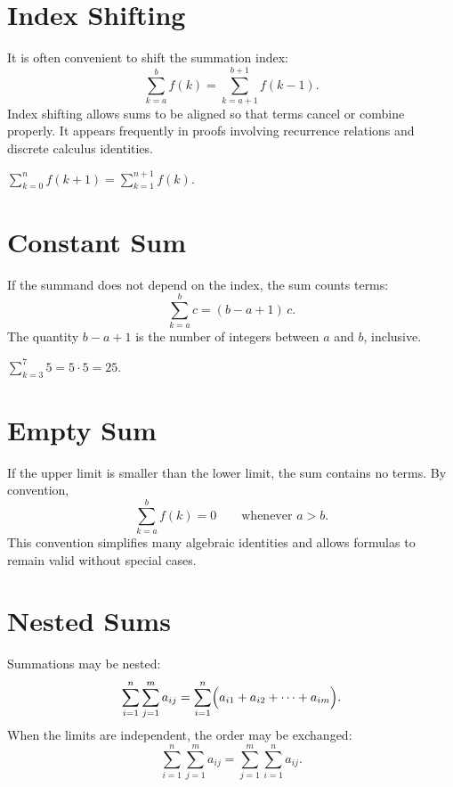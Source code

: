 \section*{Index Shifting}

\begin{remark*}
It is often convenient to shift the summation index:
\[
\sum_{k=a}^{b} f(k)
=
\sum_{k=a+1}^{b+1} f(k-1).
\]
Index shifting allows sums to be aligned so that terms cancel or
combine properly. It appears frequently in proofs involving
recurrence relations and discrete calculus identities.
\end{remark*}

\begin{example*}
\(\displaystyle\sum_{k=0}^{n} f(k+1) = \sum_{k=1}^{n+1} f(k).\)
\end{example*}

\section*{Constant Sum}

\begin{remark*}
If the summand does not depend on the index, the sum counts terms:
\[
\sum_{k=a}^{b} c = (b-a+1)\,c.
\]
The quantity \(b-a+1\) is the number of integers between \(a\) and \(b\),
inclusive.
\end{remark*}

\begin{example*}
\(\displaystyle\sum_{k=3}^{7} 5 = 5 \cdot 5 = 25.\)
\end{example*}

\section*{Empty Sum}

\begin{remark*}
If the upper limit is smaller than the lower limit, the sum contains no
terms. By convention,
\[
\sum_{k=a}^{b} f(k) = 0 \qquad \text{whenever } a>b.
\]
This convention simplifies many algebraic identities and allows formulas
to remain valid without special cases.
\end{remark*}

\section*{Nested Sums}

\begin{remark*}
Summations may be nested:
\[
\sum_{i=1}^{n}\sum_{j=1}^{m} a_{ij}
= \sum_{i=1}^{n} \Bigl(a_{i1}+a_{i2}+\cdots+a_{im}\Bigr).
\]
When the limits are independent, the order may be exchanged:
\[
\sum_{i=1}^{n}\sum_{j=1}^{m} a_{ij}
=
\sum_{j=1}^{m}\sum_{i=1}^{n} a_{ij}.
\]
\end{remark*}


